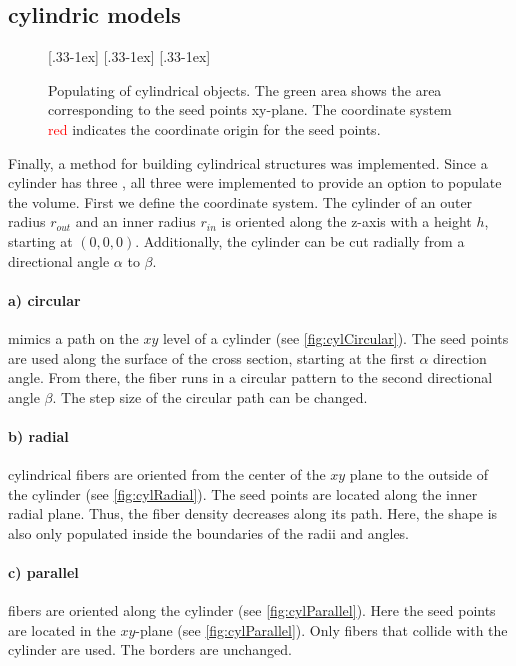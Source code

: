 \subsection{cylindric models}
% 
\begin{figure}[!t]
    \centering
    \setlength{\tikzwidth}{0.31\textwidth}
    [.33\textwidth-1ex]{
    }\hfill
    [.33\textwidth-1ex]{
    }\hfill
    [.33\textwidth-1ex]{
    }
	\caption{Populating of cylindrical objects. The green area shows the area corresponding to the seed points xy-plane. The coordinate system \textcolor{red}{red} indicates the coordinate origin for the seed points.}
\end{figure}
% 
Finally, a method for building cylindrical structures was implemented.
Since a cylinder has three , all three were implemented to provide an option to populate the volume.
First we define the coordinate system.
The cylinder of an outer radius $r_{\mathit{out}}$ and an inner radius $r_{\mathit{in}}$ is oriented along the z-axis with a height $h$, starting at $(0,0,0)$.
Additionally, the cylinder can be cut radially from a directional angle $\alpha$ to $\beta$.
% 
\paragraph{a) circular} mimics a path on the $xy$ level of a cylinder (see \cref{fig:cylCircular}).
The seed points are used along the surface of the cross section, starting at the first $\alpha$ direction angle.
From there, the fiber runs in a circular pattern to the second directional angle $\beta$.
The step size of the circular path can be changed.
% 
\paragraph{b) radial} cylindrical fibers are oriented from the center of the $xy$ plane to the outside of the cylinder (see \cref{fig:cylRadial}).
The seed points are located along the inner radial plane.
Thus, the fiber density decreases along its path.
Here, the shape is also only populated inside the boundaries of the radii and angles.
% 
\paragraph{c) parallel} fibers are oriented along the cylinder (see \cref{fig:cylParallel}).
Here the seed points are located in the $xy$-plane (see \cref{fig:cylParallel}). Only fibers that collide with the cylinder are used. The borders are unchanged.
% 
% 
% 
